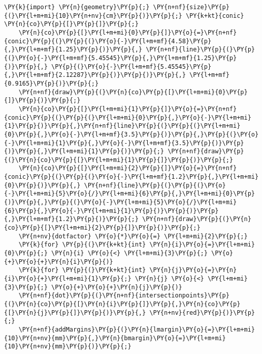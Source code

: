 \begin{Verbatim}[commandchars=\\\{\}]
    \PY{k}{import} \PY{n}{geometry}\PY{p}{;} \PY{n+nf}{size}\PY{p}{(}\PY{l+m+mi}{10}\PY{n+nv}{cm}\PY{p}{)}\PY{p}{;} \PY{k+kt}{conic} \PY{n}{co}\PY{p}{[}\PY{p}{]}\PY{p}{;}
    \PY{n}{co}\PY{p}{[}\PY{l+m+mi}{0}\PY{p}{]}\PY{o}{=}\PY{n+nf}{conic}\PY{p}{(}\PY{p}{(}\PY{o}{-}\PY{l+m+mf}{4.58}\PY{p}{,}\PY{l+m+mf}{1.25}\PY{p}{)}\PY{p}{,} \PY{n+nf}{line}\PY{p}{(}\PY{p}{(}\PY{o}{-}\PY{l+m+mf}{5.45545}\PY{p}{,}\PY{l+m+mf}{1.25}\PY{p}{)}\PY{p}{,} \PY{p}{(}\PY{o}{-}\PY{l+m+mf}{5.45545}\PY{p}{,}\PY{l+m+mf}{2.12287}\PY{p}{)}\PY{p}{)}\PY{p}{,} \PY{l+m+mf}{0.9165}\PY{p}{)}\PY{p}{;}
    \PY{n+nf}{draw}\PY{p}{(}\PY{n}{co}\PY{p}{[}\PY{l+m+mi}{0}\PY{p}{]}\PY{p}{)}\PY{p}{;}
    \PY{n}{co}\PY{p}{[}\PY{l+m+mi}{1}\PY{p}{]}\PY{o}{=}\PY{n+nf}{conic}\PY{p}{(}\PY{p}{(}\PY{l+m+mi}{0}\PY{p}{,}\PY{o}{-}\PY{l+m+mi}{1}\PY{p}{)}\PY{p}{,}\PY{n+nf}{line}\PY{p}{(}\PY{p}{(}\PY{l+m+mi}{0}\PY{p}{,}\PY{o}{-}\PY{l+m+mf}{3.5}\PY{p}{)}\PY{p}{,}\PY{p}{(}\PY{o}{-}\PY{l+m+mi}{1}\PY{p}{,}\PY{o}{-}\PY{l+m+mf}{3.5}\PY{p}{)}\PY{p}{)}\PY{p}{,}\PY{l+m+mi}{1}\PY{p}{)}\PY{p}{;} \PY{n+nf}{draw}\PY{p}{(}\PY{n}{co}\PY{p}{[}\PY{l+m+mi}{1}\PY{p}{]}\PY{p}{)}\PY{p}{;}
    \PY{n}{co}\PY{p}{[}\PY{l+m+mi}{2}\PY{p}{]}\PY{o}{=}\PY{n+nf}{conic}\PY{p}{(}\PY{p}{(}\PY{o}{-}\PY{l+m+mf}{1.2}\PY{p}{,}\PY{l+m+mi}{0}\PY{p}{)}\PY{p}{,} \PY{n+nf}{line}\PY{p}{(}\PY{p}{(}\PY{o}{-}\PY{l+m+mi}{5}\PY{o}{/}\PY{l+m+mi}{6}\PY{p}{,}\PY{l+m+mi}{0}\PY{p}{)}\PY{p}{,}\PY{p}{(}\PY{o}{-}\PY{l+m+mi}{5}\PY{o}{/}\PY{l+m+mi}{6}\PY{p}{,}\PY{o}{-}\PY{l+m+mi}{1}\PY{p}{)}\PY{p}{)}\PY{p}{,}\PY{l+m+mf}{1.2}\PY{p}{)}\PY{p}{;} \PY{n+nf}{draw}\PY{p}{(}\PY{n}{co}\PY{p}{[}\PY{l+m+mi}{2}\PY{p}{]}\PY{p}{)}\PY{p}{;}
    \PY{n+nv}{dotfactor} \PY{o}{*}\PY{o}{=} \PY{l+m+mi}{2}\PY{p}{;}
    \PY{k}{for} \PY{p}{(}\PY{k+kt}{int} \PY{n}{i}\PY{o}{=}\PY{l+m+mi}{0}\PY{p}{;} \PY{n}{i} \PY{o}{<} \PY{l+m+mi}{3}\PY{p}{;} \PY{o}{+}\PY{o}{+}\PY{n}{i}\PY{p}{)}
    \PY{k}{for} \PY{p}{(}\PY{k+kt}{int} \PY{n}{j}\PY{o}{=}\PY{n}{i}\PY{o}{+}\PY{l+m+mi}{1}\PY{p}{;} \PY{n}{j} \PY{o}{<} \PY{l+m+mi}{3}\PY{p}{;} \PY{o}{+}\PY{o}{+}\PY{n}{j}\PY{p}{)}
    \PY{n+nf}{dot}\PY{p}{(}\PY{n+nf}{intersectionpoints}\PY{p}{(}\PY{n}{co}\PY{p}{[}\PY{n}{i}\PY{p}{]}\PY{p}{,}\PY{n}{co}\PY{p}{[}\PY{n}{j}\PY{p}{]}\PY{p}{)}\PY{p}{,} \PY{n+nv}{red}\PY{p}{)}\PY{p}{;}
    \PY{n+nf}{addMargins}\PY{p}{(}\PY{n}{lmargin}\PY{o}{=}\PY{l+m+mi}{10}\PY{n+nv}{mm}\PY{p}{,}\PY{n}{bmargin}\PY{o}{=}\PY{l+m+mi}{10}\PY{n+nv}{mm}\PY{p}{)}\PY{p}{;}
\end{Verbatim}
